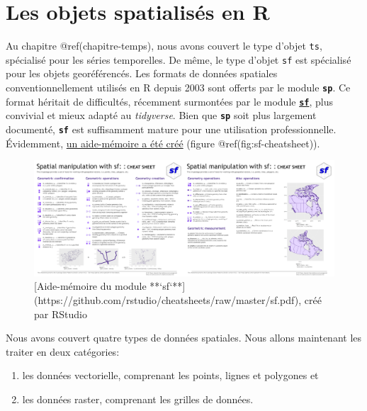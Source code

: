 \documentclass[]{book}
\providecommand{\tightlist}{%
  \setlength{\itemsep}{0pt}\setlength{\parskip}{0pt}}
\begin{document}
\hypertarget{les-objets-spatialisuxe9s-en-r}{%
\section{Les objets spatialisés en
R}\label{les-objets-spatialisuxe9s-en-r}}

Au chapitre @ref(chapitre-temps), nous avons couvert le type d'objet
\texttt{ts}, spécialisé pour les séries temporelles. De même, le type
d'objet \texttt{sf} est spécialisé pour les objets georéférencés. Les
formats de données spatiales conventionnellement utilisés en R depuis
2003 sont offerts par le module \textbf{\texttt{sp}}. Ce format héritait
de difficultés, récemment surmontées par le module
\href{https://r-spatial.github.io/sf/}{\textbf{\texttt{sf}}}, plus
convivial et mieux adapté au \emph{tidyverse}. Bien que
\textbf{\texttt{sp}} soit plus largement documenté, \textbf{\texttt{sf}}
est suffisamment mature pour une utilisation professionnelle.
Évidemment,
\href{https://github.com/rstudio/cheatsheets/raw/master/sf.pdf}{un
aide-mémoire a été créé} (figure @ref(fig:sf-cheatsheet)).

\begin{figure}

{\centering \includegraphics[width=1\linewidth]{images/12_sf-cheatsheet_canvas} 

}

\caption{[Aide-mémoire du module **`sf`**](https://github.com/rstudio/cheatsheets/raw/master/sf.pdf), créé par RStudio}\label{fig:sf-cheatsheet}
\end{figure}

Nous avons couvert quatre types de données spatiales. Nous allons
maintenant les traiter en deux catégories:

\begin{enumerate}
\def\labelenumi{\arabic{enumi}.}
\tightlist
\item
  les données vectorielle, comprenant les points, lignes et polygones et
\item
  les données raster, comprenant les grilles de données.
\end{enumerate}
\end{document}
